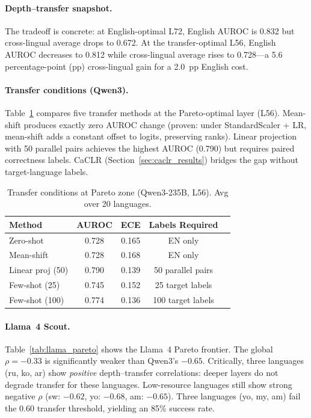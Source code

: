 \documentclass[11pt,a4paper]{article}
\begin{document}
\paragraph{Depth--transfer snapshot.}
The tradeoff is concrete: at English-optimal L72, English AUROC is 0.832 but cross-lingual average drops to 0.672.
At the transfer-optimal L56, English AUROC decreases to 0.812 while cross-lingual average rises to 0.728---a 5.6 percentage-point (pp) cross-lingual gain for a 2.0~pp English cost.

\paragraph{Transfer conditions (Qwen3).}
Table~\ref{tab:transfer_conditions} compares five transfer methods at the Pareto-optimal layer (L56).
Mean-shift produces exactly zero AUROC change (proven: under StandardScaler + LR, mean-shift adds a constant offset to logits, preserving ranks).
Linear projection with 50 parallel pairs achieves the highest AUROC (0.790) but requires paired correctness labels.
CaCLR (Section~\ref{sec:caclr_results}) bridges the gap without target-language labels.

\begin{table}[t]
\centering
\caption{Transfer conditions at Pareto zone (Qwen3-235B, L56). Avg over 20 languages.}
\label{tab:transfer_conditions}
\small
\begin{tabular}{lcccc}
\toprule
\textbf{Method} & \textbf{AUROC} & \textbf{ECE} & \textbf{Labels Required} \\
\midrule
Zero-shot        & 0.728 & 0.165 & EN only \\
Mean-shift       & 0.728 & 0.168 & EN only \\
Linear proj (50) & 0.790 & 0.139 & 50 parallel pairs \\
Few-shot (25)    & 0.745 & 0.152 & 25 target labels \\
Few-shot (100)   & 0.774 & 0.136 & 100 target labels \\
\bottomrule
\end{tabular}
\end{table}

\paragraph{Llama~4 Scout.}
Table~\ref{tab:llama_pareto} shows the Llama~4 Pareto frontier.
The global $\rho = -0.33$ is significantly weaker than Qwen3's $-0.65$.
Critically, three languages (ru, ko, ar) show \emph{positive} depth--transfer correlations: deeper layers do not degrade transfer for these languages.
Low-resource languages still show strong negative $\rho$ (sw: $-0.62$, yo: $-0.68$, am: $-0.65$).
Three languages (yo, my, am) fail the 0.60 transfer threshold, yielding an 85\% success rate.
\end{document}
